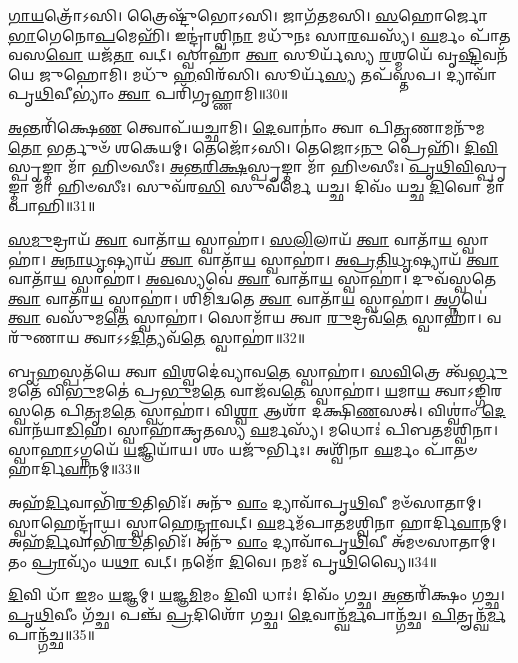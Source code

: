 \-\ul{𑌗𑌾}\-\-\ul{𑌯}\-𑌤𑍍𑌰𑍋᳴𑌽𑌸𑌿। 
𑌤𑍍𑌰𑍈𑌷𑍍𑌟𑍁᳴𑌭𑍋𑌽𑌸𑌿। 
𑌜𑌾𑌗᳴𑌤𑌮𑌸𑌿। 
\-\ul{𑌸}\-𑌹𑍋𑌰𑍍𑌜𑍋 \ul{𑌭𑌾}\-𑌗𑍇𑌨𑍋\-\ul{𑌪}\-𑌮𑍇𑌹𑌿᳴। 
𑌇𑌨𑍍𑌦𑍍𑌰𑌾॑𑌶𑍍𑌵𑌿\-\ul{𑌨𑌾} 𑌮𑌧𑍁᳴𑌨𑌃 𑌸𑌾\-\ul{𑌰}\-𑌘𑌸𑍍𑌯᳴। 
\-\ul{𑌘}\-𑌰𑍍𑌮𑌂 𑌪𑌾᳴𑌤 𑌵𑌸\-\ul{𑌵𑍋} 𑌯𑌜᳴\-\ul{𑌤𑌾} 𑌵𑌟𑍍। 
𑌸𑍍𑌵𑌾𑌹𑌾॑ \ul{𑌤𑍍𑌵𑌾} 𑌸𑍂𑌰𑍍𑌯᳴𑌸𑍍𑌯 \ul{𑌰}\-𑌶𑍍𑌮𑌯𑍇᳴ 𑌵𑍃\-\ul{𑌷𑍍𑌟𑌿}\-𑌵𑌨᳴𑌯𑍇 𑌜𑍁𑌹𑍋𑌮𑌿। 
𑌮𑌧𑍁᳴ \ul{𑌹}\-𑌵𑌿𑌰᳴𑌸𑌿। 
𑌸𑍂𑌰𑍍𑌯᳴\-\ul{𑌸𑍍𑌯} 𑌤𑌪᳴𑌸𑍍𑌤𑌪। 
𑌦𑍍𑌯𑌾𑌵𑌾᳴𑌪𑍃\-\ul{𑌥𑌿}\-𑌵𑍀𑌭𑍍𑌯𑌾𑌂॑ \ul{𑌤𑍍𑌵𑌾} 𑌪𑌰𑌿᳴𑌗𑍃𑌹𑍍𑌣𑌾𑌮𑌿॥30॥

\-\ul{𑌅}\-𑌨𑍍𑌤𑌰𑌿᳴𑌕𑍍𑌷𑍇\-\ul{𑌣} 𑌤𑍍𑌵𑍋𑌪᳴𑌯𑌚𑍍𑌛𑌾𑌮𑌿। 
\-\ul{𑌦𑍇}\-𑌵𑌾𑌨𑌾𑌂॑ 𑌤𑍍𑌵𑌾 𑌪𑌿\-\ul{𑌤𑍃}\-𑌣𑌾𑌮𑌨𑍁᳴𑌮\-\ul{𑌤𑍋} 𑌭𑌰𑍍𑌤𑍁𑍞᳴ 𑌶𑌕𑍇𑌯𑌮𑍍। 
𑌤𑍇𑌜𑍋᳴𑌽𑌸𑌿। 
𑌤𑍇𑌜𑍋𑌽\-\ul{𑌨𑍁} 𑌪𑍍𑌰𑍇𑌹𑌿᳴। 
\-\ul{𑌦𑌿}\-\-\ul{𑌵𑌿}\-𑌸𑍍𑌪𑍃𑌙𑍍𑌮𑌾 𑌮𑌾᳴ 𑌹𑌿𑍞𑌸𑍀𑌃। 
\-\ul{𑌅}\-\-\ul{𑌨𑍍𑌤}\-\-\ul{𑌰𑌿}\-\-\ul{𑌕𑍍𑌷}\-𑌸𑍍𑌪𑍃𑌙𑍍𑌮𑌾 𑌮𑌾᳴ 𑌹𑌿𑍞𑌸𑍀𑌃। 
\-\ul{𑌪𑍃}\-\-\ul{𑌥𑌿}\-\-\ul{𑌵𑌿}\-𑌸𑍍𑌪𑍃𑌙𑍍𑌮𑌾 𑌮𑌾᳴ 𑌹𑌿𑍞𑌸𑍀𑌃। 
𑌸𑍁𑌵᳴𑌰\-\ul{𑌸𑌿} 𑌸𑍁𑌵᳴𑌰𑍍𑌮𑍇 𑌯𑌚𑍍𑌛। 
𑌦𑌿𑌵𑌂᳴ 𑌯𑌚𑍍𑌛 \ul{𑌦𑌿}\-𑌵𑍋 𑌮𑌾᳴ 𑌪𑌾𑌹𑌿॥31॥
\anuvakamend[𑌏𑌹𑌿᳴ 𑌪𑌾𑌹𑌿 𑌪𑌿𑌨𑍍𑌵𑌸𑍍𑌵 𑌗𑍃𑌹𑍍𑌣𑌾\-\ul{𑌮𑌿} 𑌨𑌵᳴ 𑌚]

\-\ul{𑌸}\-\-\ul{𑌮𑍁}\-𑌦𑍍𑌰𑌾𑌯᳴ \ul{𑌤𑍍𑌵𑌾} 𑌵𑌾𑌤𑌾᳴\-\ul{𑌯} 𑌸𑍍𑌵𑌾𑌹𑌾॑। 
\-\ul{𑌸}\-\-\ul{𑌲𑌿}\-𑌲𑌾𑌯᳴ \ul{𑌤𑍍𑌵𑌾} 𑌵𑌾𑌤𑌾᳴\-\ul{𑌯} 𑌸𑍍𑌵𑌾𑌹𑌾॑। 
\-\ul{𑌅}\-\-\ul{𑌨𑌾}\-\-\ul{𑌧𑍃}\-𑌷𑍍𑌯𑌾𑌯᳴ \ul{𑌤𑍍𑌵𑌾} 𑌵𑌾𑌤𑌾᳴\-\ul{𑌯} 𑌸𑍍𑌵𑌾𑌹𑌾॑। 
\-\ul{𑌅}\-\-\ul{𑌪𑍍𑌰}\-\-\ul{𑌤𑌿}\-\-\ul{𑌧𑍃}\-𑌷𑍍𑌯𑌾𑌯᳴ \ul{𑌤𑍍𑌵𑌾} 𑌵𑌾𑌤𑌾᳴\-\ul{𑌯} 𑌸𑍍𑌵𑌾𑌹𑌾॑। 
\-\ul{𑌅}\-\-\ul{𑌵}\-𑌸𑍍𑌯𑌵𑍇॑ \ul{𑌤𑍍𑌵𑌾} 𑌵𑌾𑌤𑌾᳴\-\ul{𑌯} 𑌸𑍍𑌵𑌾𑌹𑌾॑। 
𑌦𑍁𑌵᳴𑌸𑍍𑌵𑌤𑍇 \ul{𑌤𑍍𑌵𑌾} 𑌵𑌾𑌤𑌾᳴\-\ul{𑌯} 𑌸𑍍𑌵𑌾𑌹𑌾॑। 
𑌶𑌿𑌮𑌿᳴𑌦𑍍𑌵𑌤𑍇 \ul{𑌤𑍍𑌵𑌾} 𑌵𑌾𑌤𑌾᳴\-\ul{𑌯} 𑌸𑍍𑌵𑌾𑌹𑌾॑। 
\-\ul{𑌅}\-𑌗𑍍𑌨𑌯𑍇॑ \ul{𑌤𑍍𑌵𑌾} 𑌵𑌸𑍁᳴𑌮\-\ul{𑌤𑍇} 𑌸𑍍𑌵𑌾𑌹𑌾॑। 
𑌸𑍋𑌮𑌾᳴𑌯 𑌤𑍍𑌵𑌾 \ul{𑌰𑍁}\-𑌦𑍍𑌰𑌵᳴\-\ul{𑌤𑍇} 𑌸𑍍𑌵𑌾𑌹𑌾॑। 
𑌵𑌰𑍁᳴𑌣𑌾𑌯 𑌤𑍍𑌵𑌾𑌽𑌽\-\ul{𑌦𑌿}\-𑌤𑍍𑌯𑌵᳴\-\ul{𑌤𑍇} 𑌸𑍍𑌵𑌾𑌹𑌾॑॥32॥

𑌬𑍃\-\ul{𑌹}\-𑌸𑍍𑌪𑌤᳴𑌯𑍇 𑌤𑍍𑌵𑌾 \ul{𑌵𑌿}\-𑌶𑍍𑌵𑌦𑍇॑𑌵𑍍𑌯𑌾𑌵\-\ul{𑌤𑍇} 𑌸𑍍𑌵𑌾𑌹𑌾॑। 
\-\ul{𑌸}\-\-\ul{𑌵𑌿}\-𑌤𑍍𑌰𑍇 𑌤𑍍𑌵᳴\-\ul{𑌰𑍍𑌭𑍁}\-𑌮𑌤𑍇᳴ 𑌵𑌿\-\ul{𑌭𑍁}\-𑌮𑌤𑍇॑ 𑌪𑍍𑌰\-\ul{𑌭𑍁}\-𑌮\-\ul{𑌤𑍇} 𑌵𑌾𑌜᳴𑌵\-\ul{𑌤𑍇} 𑌸𑍍𑌵𑌾𑌹𑌾॑। 
\-\ul{𑌯}\-𑌮𑌾\-\ul{𑌯} 𑌤𑍍𑌵𑌾𑌽𑌙𑍍𑌗𑌿᳴𑌰𑌸𑍍𑌵𑌤𑍇 𑌪𑌿\-\ul{𑌤𑍃}\-𑌮\-\ul{𑌤𑍇} 𑌸𑍍𑌵𑌾𑌹𑌾॑। 
𑌵𑌿\-\ul{𑌶𑍍𑌵𑌾} 𑌆𑌶𑌾᳴ 𑌦𑌕𑍍𑌷𑌿\-\ul{𑌣}\-𑌸𑌤𑍍। 
𑌵𑌿𑌶𑍍𑌵𑌾𑌂॑ \ul{𑌦𑍇}\-𑌵𑌾𑌨᳴𑌯𑌾\-\ul{𑌡𑌿}\-𑌹। 
𑌸𑍍𑌵𑌾𑌹𑌾᳴𑌕𑍃𑌤𑌸𑍍𑌯 \ul{𑌘}\-𑌰𑍍𑌮𑌸𑍍𑌯᳴। 
𑌮𑌧𑍋𑌃॑ 𑌪𑌿𑌬𑌤𑌮𑌶𑍍𑌵𑌿𑌨𑌾। 
𑌸𑍍𑌵𑌾\-\ul{𑌹𑌾}\-𑌽𑌗𑍍𑌨𑌯𑍇᳴ \ul{𑌯}\-𑌜𑍍𑌞𑌿𑌯𑌾᳴𑌯। 
𑌶𑌂 𑌯𑌜𑍁᳴𑌰𑍍𑌭𑌿𑌃। 
𑌅𑌶𑍍𑌵𑌿᳴𑌨𑌾 \ul{𑌘}\-𑌰𑍍𑌮𑌂 𑌪𑌾᳴𑌤𑍞 𑌹𑌾𑌰𑍍𑌦𑌿\-\ul{𑌵𑌾}\-𑌨𑌮𑍍॥33॥

𑌅𑌹᳴\-\ul{𑌰𑍍𑌦𑌿}\-𑌵𑌾𑌭𑌿᳴\-\ul{𑌰𑍂}\-𑌤𑌿𑌭𑌿𑌃᳴। 
𑌅𑌨𑍁᳴ \ul{𑌵𑌾𑌂} 𑌦𑍍𑌯𑌾𑌵𑌾᳴𑌪𑍃\-\ul{𑌥𑌿}\-𑌵𑍀 𑌮𑍞᳴𑌸𑌾𑌤𑌾𑌮𑍍। 
𑌸𑍍𑌵𑌾𑌹𑍇𑌨𑍍𑌦𑍍𑌰𑌾᳴𑌯। 
𑌸𑍍𑌵𑌾𑌹𑍇\-\ul{𑌨𑍍𑌦𑍍𑌰𑌾}\-𑌵𑌟𑍍। 
\-\ul{𑌘}\-𑌰𑍍𑌮𑌮᳴𑌪𑌾𑌤𑌮𑌶𑍍𑌵𑌿𑌨𑌾 𑌹𑌾𑌰𑍍𑌦𑌿\-\ul{𑌵𑌾}\-𑌨𑌮𑍍। 
𑌅𑌹᳴\-\ul{𑌰𑍍𑌦𑌿}\-𑌵𑌾𑌭𑌿᳴\-\ul{𑌰𑍂}\-𑌤𑌿𑌭𑌿𑌃᳴। 
𑌅𑌨𑍁᳴ \ul{𑌵𑌾𑌂} 𑌦𑍍𑌯𑌾𑌵𑌾᳴𑌪𑍃\-\ul{𑌥𑌿}\-𑌵𑍀 𑌅᳴𑌮𑍞𑌸𑌾𑌤𑌾𑌮𑍍। 
𑌤𑌂 \ul{𑌪𑍍𑌰𑌾}\-𑌵𑍍𑌯𑌂᳴ 𑌯\-\ul{𑌥𑌾} 𑌵𑌟𑍍। 
𑌨𑌮𑍋᳴ \ul{𑌦𑌿}\-𑌵𑍇। 
𑌨𑌮𑌃᳴ 𑌪𑍃\-\ul{𑌥𑌿}\-𑌵𑍍𑌯𑍈॥34॥

\-\ul{𑌦𑌿}\-𑌵𑌿 𑌧𑌾᳴ \ul{𑌇}\-𑌮𑌂 \ul{𑌯}\-𑌜𑍍𑌞𑌮𑍍। 
\-\ul{𑌯}\-𑌜𑍍𑌞\-\ul{𑌮𑌿}\-𑌮𑌂 \ul{𑌦𑌿}\-𑌵𑌿 𑌧𑌾𑌃॑। 
𑌦𑌿𑌵𑌂᳴ 𑌗𑌚𑍍𑌛। 
\-\ul{𑌅}\-𑌨𑍍𑌤𑌰𑌿᳴𑌕𑍍𑌷𑌂 𑌗𑌚𑍍𑌛। 
\-\ul{𑌪𑍃}\-\-\ul{𑌥𑌿}\-𑌵𑍀𑌂 𑌗᳴𑌚𑍍𑌛। 
𑌪𑌞𑍍𑌚᳴ \ul{𑌪𑍍𑌰}\-𑌦𑌿𑌶𑍋᳴ 𑌗𑌚𑍍𑌛। 
\-\ul{𑌦𑍇}\-𑌵𑌾𑌨𑍍𑌘᳴\-\ul{𑌰𑍍𑌮}\-𑌪𑌾𑌨𑍍𑌗᳴𑌚𑍍𑌛। 
\-\ul{𑌪𑌿}\-𑌤𑍄𑌨𑍍𑌘᳴\-\ul{𑌰𑍍𑌮}\-𑌪𑌾𑌨𑍍𑌗᳴𑌚𑍍𑌛॥35॥
\anuvakamend[\-\ul{𑌆}\-\-\ul{𑌦𑌿}\-𑌤𑍍𑌯𑌵᳴\-\ul{𑌤𑍇} 𑌸𑍍𑌵𑌾𑌹𑌾᳴ 𑌹𑌾𑌰𑍍𑌦𑌿\-\ul{𑌵𑌾}\-𑌨𑌂 𑌪𑍃᳴\-\ul{𑌥𑌿}\-𑌵𑍍𑌯𑌾 \ul{𑌅}\-𑌷𑍍𑌟𑍗 𑌚᳴]

